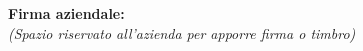 \vspace*{\fill} %
\noindent
\begin{minipage}{0.60\textwidth}
    {\small
    \textbf{Firma aziendale:}\\[0.3cm]
    \textit{(Spazio riservato all’azienda per apporre firma o timbro)}\\[0.8cm]
    \fbox{\rule{0pt}{2.5cm}\rule{5cm}{0pt}} %
    }
\end{minipage}
